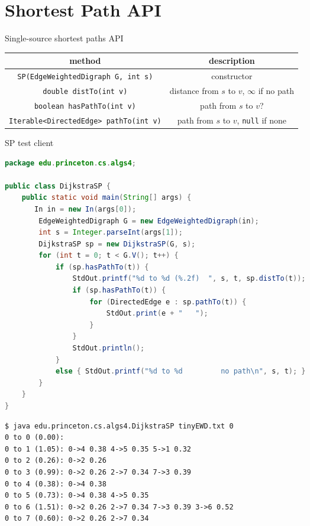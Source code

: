 \documentclass[8pt,a4paper,compress]{beamer}
\begin{document}
\section{Shortest Path API}
\begin{frame}[fragile]
\pause

Single-source shortest paths API
\begin{center}
\begin{tabular}{cc}
method & description \\ \hline
\lstinline$SP(EdgeWeightedDigraph G, int s)$ & constructor \\
\lstinline$double distTo(int v)$ & distance from $s$ to $v$, $\infty$ if no path \\
\lstinline$boolean hasPathTo(int v)$ & path from $s$ to $v$? \\
\lstinline$Iterable<DirectedEdge> pathTo(int v)$ & path from $s$ to $v$, \lstinline$null$ if none
\end{tabular}  
\end{center}

\pause

SP test client
\begin{lstlisting}[language=Java]
package edu.princeton.cs.algs4;

public class DijkstraSP {
    public static void main(String[] args) {
       In in = new In(args[0]);
        EdgeWeightedDigraph G = new EdgeWeightedDigraph(in);
        int s = Integer.parseInt(args[1]);
        DijkstraSP sp = new DijkstraSP(G, s);
        for (int t = 0; t < G.V(); t++) {
            if (sp.hasPathTo(t)) {
                StdOut.printf("%d to %d (%.2f)  ", s, t, sp.distTo(t));
                if (sp.hasPathTo(t)) {
                    for (DirectedEdge e : sp.pathTo(t)) {
                        StdOut.print(e + "   ");
                    }
                }
                StdOut.println();
            }
            else { StdOut.printf("%d to %d         no path\n", s, t); }
        }
    }
}
\end{lstlisting}
\end{frame}

\begin{frame}[fragile]
\pause

\begin{lstlisting}[language={}]
$ java edu.princeton.cs.algs4.DijkstraSP tinyEWD.txt 0
0 to 0 (0.00):
0 to 1 (1.05): 0->4 0.38 4->5 0.35 5->1 0.32
0 to 2 (0.26): 0->2 0.26
0 to 3 (0.99): 0->2 0.26 2->7 0.34 7->3 0.39
0 to 4 (0.38): 0->4 0.38
0 to 5 (0.73): 0->4 0.38 4->5 0.35
0 to 6 (1.51): 0->2 0.26 2->7 0.34 7->3 0.39 3->6 0.52
0 to 7 (0.60): 0->2 0.26 2->7 0.34
\end{lstlisting}
\end{frame}
\end{document}
